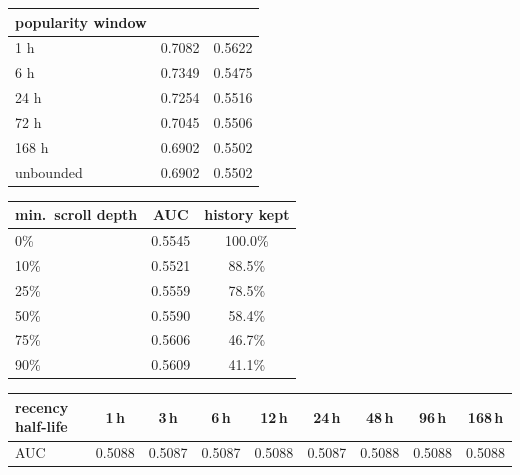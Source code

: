 \begin{tabular}[t]{@{}lcc@{}}
\toprule
popularity window & \eb{} & \mind{} \\
\midrule
1 h & 0.7082 & 0.5622 \\
6 h & 0.7349 & 0.5475 \\
24 h & 0.7254 & 0.5516 \\
72 h & 0.7045 & 0.5506 \\
168 h & 0.6902 & 0.5502 \\
unbounded & 0.6902 & 0.5502 \\
\bottomrule
\end{tabular}\hfill
\begin{tabular}[t]{@{}lcc@{}}
\toprule
min.\ scroll depth & AUC & history kept \\
\midrule
0\% & 0.5545 & 100.0\% \\
10\% & 0.5521 & 88.5\% \\
25\% & 0.5559 & 78.5\% \\
50\% & 0.5590 & 58.4\% \\
75\% & 0.5606 & 46.7\% \\
90\% & 0.5609 & 41.1\% \\
\bottomrule
\end{tabular}

\medskip
\begin{tabular}{@{}lcccccccc@{}}
\toprule
recency half-life & 1\,h & 3\,h & 6\,h & 12\,h & 24\,h & 48\,h & 96\,h & 168\,h \\
\midrule
\eb{} AUC & 0.5088 & 0.5087 & 0.5087 & 0.5088 & 0.5087 & 0.5088 & 0.5088 & 0.5088 \\
\bottomrule
\end{tabular}
